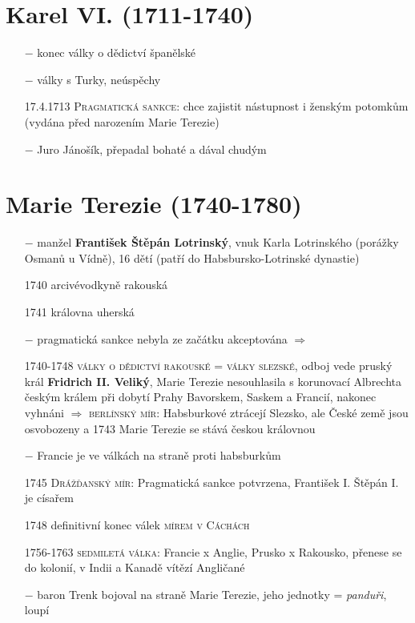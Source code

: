 \documentclass{article}
\begin{document}
\section*{Karel VI. (1711-1740)}
\begin{itemize}
    \vspace{-0.5em}
    \setlength\itemsep{0.15em}
    \item[$-$] konec války o dědictví španělské
    \item[$-$] války s Turky, neúspěchy
    \item[17.4.1713] \textsc{Pragmatická sankce}: chce zajistit nástupnost i ženským potomkům (vydána před narozením Marie Terezie)
    \item[$-$] Juro Jánošík, přepadal bohaté a dával chudým
\end{itemize}

\section*{Marie Terezie (1740-1780)}
\begin{itemize}
    \vspace{-0.5em}
    \setlength\itemsep{0.15em}
    \item[$-$] manžel \textbf{František Štěpán Lotrinský}, vnuk Karla Lotrinského (porážky Osmanů u Vídně), 16 dětí (patří do Habsbursko-Lotrinské dynastie)
    \item[1740] arcivévodkyně rakouská
    \item[1741] královna uherská
    \item[$-$] pragmatická sankce nebyla ze začátku akceptována $\Rightarrow$
    \item[1740-1748] \textsc{války o dědictví rakouské} = \textsc{války slezské}, odboj vede pruský král \textbf{Fridrich II. Veliký}, Marie Terezie nesouhlasila s korunovací Albrechta českým králem při dobytí Prahy Bavorskem, Saskem a Francií, nakonec vyhnáni $\Rightarrow$ \textsc{berlínský mír}: Habsburkové ztrácejí Slezsko, ale České země jsou osvobozeny a 1743 Marie Terezie se stává českou královnou
    \item[$-$] Francie je ve válkách na straně proti habsburkům
    \item[1745] \textsc{Drážďanský mír}: Pragmatická sankce potvrzena, František I. Štěpán I. je císařem
    \item[1748] definitivní konec válek \textsc{mírem v Cáchách}
    \item[1756-1763] \textsc{sedmiletá válka}: Francie x Anglie, Prusko x Rakousko, přenese se do kolonií, v Indii a Kanadě vítězí Angličané
    \item[$-$] baron Trenk bojoval na straně Marie Terezie, jeho jednotky = \textit{panduři}, loupí 
\end{itemize}
\end{document}
